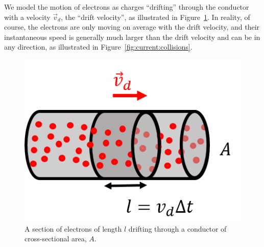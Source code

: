 We model the motion of electrons as charges ``drifting'' through the conductor with a velocity $\vec v_d$, the ``drift velocity'', as illustrated in Figure~\ref{fig:current:microcurrent}. In reality, of course, the electrons are only moving on average with the drift velocity, and their instantaneous speed is generally much larger than the drift velocity and can be in any direction, as illustrated in Figure~\ref{fig:current:collisions}.

\begin{figure}[!htbp]
\centering
\includegraphics[width=0.4\linewidth]{files/microcurrent-f26d3b3d3edf9ea7da4f38af7b2acf72.png}
\caption[]{A section of electrons of length $l$ drifting through a conductor of cross-sectional area, $A$.}
\label{fig:current:microcurrent}
\end{figure}

